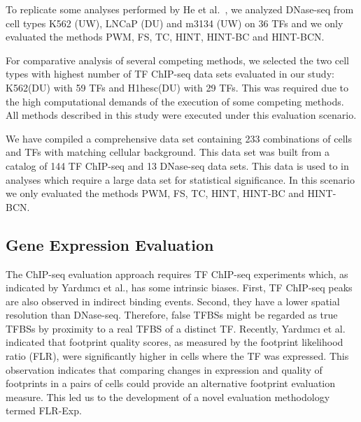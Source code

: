  To replicate some analyses performed by He et al.~\cite{he2014}, we analyzed DNase-seq from cell types K562 (UW), LNCaP (DU) and m3134 (UW) on 36 TFs and we only evaluated the methods PWM, FS, TC, HINT, HINT-BC and HINT-BCN.

 For comparative analysis of several competing methods, we selected the two cell types with highest number of TF ChIP-seq data sets evaluated in our study: K562(DU) with 59 TFs and H1hesc(DU) with 29 TFs. This was required due to the high computational demands of the execution of some competing methods. All methods described in this study were executed under this evaluation scenario.

 We have compiled a comprehensive data set containing 233 combinations of cells and TFs with matching cellular background. This data set was built from a catalog of 144 TF ChIP-seq and 13 DNase-seq data sets. This data is used to in analyses which require a large data set for statistical significance. In this scenario we only evaluated the methods PWM, FS, TC, HINT, HINT-BC and HINT-BCN.


\subsection{Gene Expression Evaluation}
\label{sec:gene.expression.evaluation}

The ChIP-seq evaluation approach requires TF ChIP-seq experiments which, as indicated by Yard{\i}mc{\i} et al.\cite{yardimci2014}, has some intrinsic biases. First, TF ChIP-seq peaks are also observed in indirect binding events. Second, they have a lower spatial resolution than DNase-seq. Therefore, false TFBSs might be regarded as true TFBSs by proximity to a real TFBS of a distinct TF. Recently, Yard{\i}mc{\i} et al.\cite{yardimci2014} indicated that footprint quality scores, as measured by the footprint likelihood ratio (FLR), were significantly higher in cells where the TF was expressed. This observation indicates that comparing changes in expression and quality of footprints in a pairs of cells could provide an alternative footprint evaluation measure. This led us to the development of a novel evaluation methodology termed FLR-Exp.


